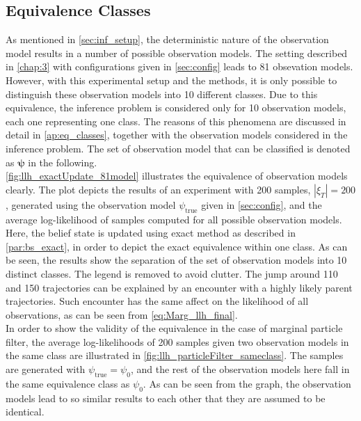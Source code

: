 \subsection{Equivalence Classes}
\label{sec:eq_classes}
As mentioned in \cref{sec:inf_setup}, the deterministic nature of the observation model results in a number of possible observation models. The setting described in \cref{chap:3} with configurations given in \cref{sec:config} leads to 81 obsevation models. However, with this experimental setup and the methods, it is only possible to distinguish these observation models into 10 different classes. Due to this equivalence, the inference problem is considered only for 10 observation models, each one representing one class. The reasons of this phenomena are discussed in detail in \cref{ap:eq_classes}, together with the observation models considered in the inference problem. The set of observation model that can be classified is denoted as $ \symbf{\psi} $ in the following. \\
\autoref{fig:llh_exactUpdate_81model} illustrates the equivalence of observation models clearly. The plot depicts the results of an experiment with 200 samples, $ |\xi_T| = 200 $, generated using the observation model $ \psi_{\text{true}} $ given in \cref{sec:config}, and the average log-likelihood of samples computed for all possible observation models. Here, the belief state is updated using exact method as described in \cref{par:bs_exact}, in order to depict the exact equivalence within one class. As can be seen, the results show the separation of the set of observation models into 10 distinct classes. The legend is removed to avoid clutter. The jump around 110 and 150 trajectories can be explained by an encounter with a highly likely parent trajectories. Such encounter has the same affect on the likelihood of all observations, as can be seen from \autoref{eq:Marg_llh_final}.\\
In order to show the validity of the equivalence in the case of marginal particle filter, the average log-likelihoods of 200 samples given two observation models in the same class are illustrated in \autoref{fig:llh_particleFilter_sameclass}. The samples are generated with $ \psi_{\text{true}} = \psi_{0} $, and the rest of the observation models here fall in the same equivalence class as $ \psi_0 $. As can be seen from the graph, the observation models lead to so similar results to each other that they are assumed to be identical. 

